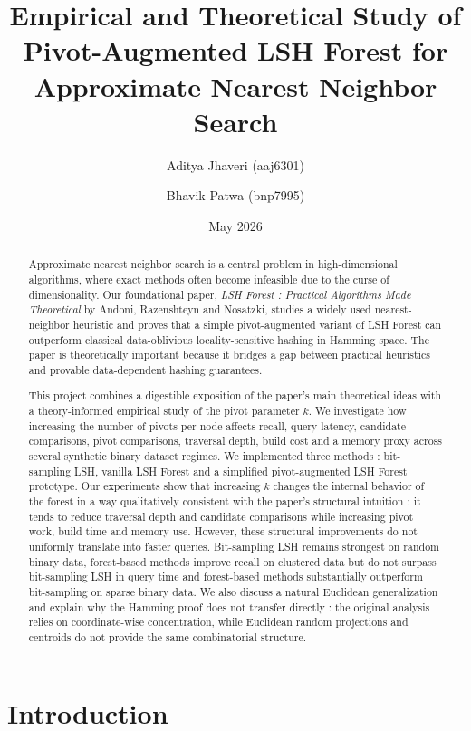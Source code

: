 \documentclass[11pt]{article}
\title{Empirical and Theoretical Study of Pivot-Augmented LSH Forest for Approximate Nearest Neighbor Search}
\author{Aditya Jhaveri (aaj6301) \and Bhavik Patwa (bnp7995)}
\date{May 2026}
\begin{document}
\maketitle

\begin{abstract}
Approximate nearest neighbor search is a central problem in high-dimensional algorithms, where exact methods often become infeasible due to the curse of dimensionality. Our foundational paper, \emph{LSH Forest : Practical Algorithms Made Theoretical} by Andoni, Razenshteyn and Nosatzki, studies a widely used nearest-neighbor heuristic and proves that a simple pivot-augmented variant of LSH Forest can outperform classical data-oblivious locality-sensitive hashing in Hamming space. The paper is theoretically important because it bridges a gap between practical heuristics and provable data-dependent hashing guarantees.

This project combines a digestible exposition of the paper's main theoretical ideas with a theory-informed empirical study of the pivot parameter $k$. We investigate how increasing the number of pivots per node affects recall, query latency, candidate comparisons, pivot comparisons, traversal depth, build cost and a memory proxy across several synthetic binary dataset regimes. We implemented three methods : bit-sampling LSH, vanilla LSH Forest and a simplified pivot-augmented LSH Forest prototype. Our experiments show that increasing $k$ changes the internal behavior of the forest in a way qualitatively consistent with the paper's structural intuition : it tends to reduce traversal depth and candidate comparisons while increasing pivot work, build time and memory use. However, these structural improvements do not uniformly translate into faster queries. Bit-sampling LSH remains strongest on random binary data, forest-based methods improve recall on clustered data but do not surpass bit-sampling LSH in query time and forest-based methods substantially outperform bit-sampling on sparse binary data. We also discuss a natural Euclidean generalization and explain why the Hamming proof does not transfer directly : the original analysis relies on coordinate-wise concentration, while Euclidean random projections and centroids do not provide the same combinatorial structure.
\end{abstract}

\section{Introduction}
\end{document}

